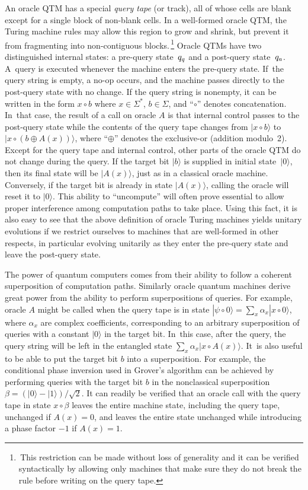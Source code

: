 An oracle QTM has a special {\em query tape\/} (or track), all of
whose cells are blank except for a single block of non-blank cells.
In a well-formed oracle QTM, the Turing machine rules may allow this region
to grow and shrink, but prevent it from
fragmenting into non-contiguous blocks.\,\footnote{\,This restriction
can be made without loss of generality and it can be verified
syntactically by allowing only machines that make sure they
do not break the rule before writing on the query tape.}
Oracle QTMs have two distinguished internal states: a pre-query state~$q_q$
and a post-query state~$q_a$.  A~query is executed whenever
the machine enters the pre-query state.
If~the query string is empty, a no-op occurs, and the machine passes directly
to the post-query state with no change.  If the query string is nonempty, it
can be written in the form $x \circ b$ where $x \in \Sigma^*$,
$b \in \Sigma$, and ``$\circ$'' denotes concatenation.
In~that case, the result of a call on oracle $A$ is that internal
control passes to the post-query state while the contents of the query tape
changes from $|x\circ b\rangle$ to $|x \circ (b\oplus A(x))\rangle$,
where ``$\oplus$'' denotes the exclusive-or (addition modulo~2).
Except for the query tape and internal
control, other parts of the oracle QTM do not change during the query.
If the target bit $|b\rangle$ is supplied in initial state~$|0\rangle$,
then its final state will be $|A(x)\rangle$, just as in a classical
oracle machine.  Conversely, if the target bit is already in state
$|A(x)\rangle$, calling the oracle will reset it to $|0\rangle$. This ability
to ``uncompute'' will often prove essential to allow proper
interference among computation paths to take place.
Using this fact, it is also easy to see that
the above definition of oracle Turing machines yields unitary evolutions
if we restrict ourselves to
machines that are well-formed in other respects, in particular evolving
unitarily as they enter the pre-query state and leave the post-query state.

The power of quantum computers comes from their ability to follow a
coherent superposition of computation paths.  Similarly oracle quantum
machines derive great power from the ability to perform superpositions
of queries.  For example, oracle $A$ might be called
when the query tape is in state
$|\psi\circ 0\rangle=\sum_x \alpha_x|x\circ 0\rangle$,
where $\alpha_x$ are complex coefficients, corresponding to an arbitrary
superposition of queries with a constant $|0\rangle$ in the target bit.
In~this case, after the query, the query string will be left in the entangled
state $\sum_x \alpha_x | x \circ A(x) \rangle$.
It~is also useful to be able to put the target bit $b$ into a
superposition. For example, the conditional phase inversion used in
Grover's algorithm can be achieved by performing queries with the target
bit $b$ in the nonclassical superposition
$\beta=(|0\rangle-|1\rangle)/\sqrt{2}$. It can readily be verified
that an oracle call with the query tape in state $x\circ\beta$ leaves
the entire machine state, \mbox{including} the query tape, unchanged if
$A(x)=0$, and leaves the entire state unchanged while introducing a
phase factor $-1$ if $A(x)=1$.

